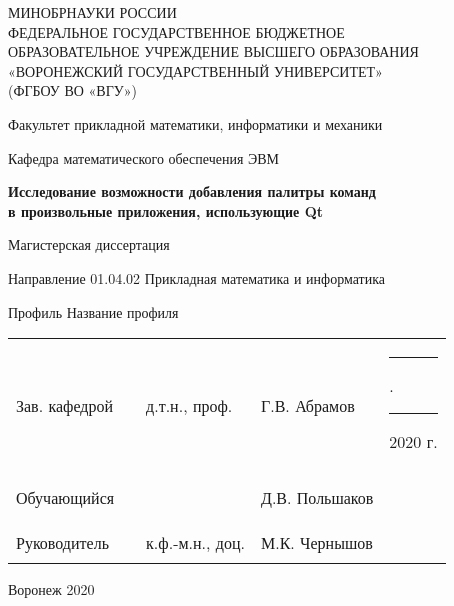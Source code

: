 \newcommand{\disserDepartment}{математического обеспечения ЭВМ}
\newcommand{\disserProgram}{01.04.02 Прикладная математика и информатика}
\newcommand{\disserTitle}{Исследование возможности добавления палитры команд \\ в произвольные приложения, использующие Qt}
\newcommand{\disserProfile}{Название профиля}

\newcommand{\disserHeadOfDepStatus}{д.т.н., проф.}
\newcommand{\disserHeadOfDepName}{Г.В. Абрамов}
\newcommand{\disserStudent}{Д.В. Польшаков}

\newcommand{\disserSupervisorStatus}{к.ф.-м.н., доц.}
\newcommand{\disserSupervisorName}{М.К. Чернышов}

\thispagestyle{empty}
\begin{center}
МИНОБРНАУКИ РОССИИ \\
ФЕДЕРАЛЬНОЕ ГОСУДАРСТВЕННОЕ БЮДЖЕТНОЕ \\
ОБРАЗОВАТЕЛЬНОЕ УЧРЕЖДЕНИЕ ВЫСШЕГО ОБРАЗОВАНИЯ \\
«ВОРОНЕЖСКИЙ ГОСУДАРСТВЕННЫЙ УНИВЕРСИТЕТ» \\
(ФГБОУ ВО «ВГУ»)

\vspace{2ex}

Факультет прикладной математики, информатики и механики

\vspace{2ex}

Кафедра \disserDepartment{}

\vspace{3.5cm}
\textbf{\disserTitle}

\vspace{1cm}
Магистерская диссертация

\vspace{0.5cm}
Направление \disserProgram{}

\vspace{0.5cm}
Профиль \disserProfile{}

\vspace{4cm}

\begin{center}
  \begin{tabular}{ l l l l l }
    Зав. кафедрой & \rule{25mm}{0.1mm} & \disserHeadOfDepStatus{}  & \disserHeadOfDepName{} & \rule{7mm}{0.1mm}.\rule{7mm}{0.1mm} 2020 г.  \\
    & \\
    Обучающийся   & \rule{25mm}{0.1mm} &                           & \disserStudent{} & \\
    & \\
    Руководитель  & \rule{25mm}{0.1mm} & \disserSupervisorStatus{} & \disserSupervisorName{} & \\
  \end{tabular}
\end{center}

\vspace{3cm}
Воронеж 2020
\end{center}
